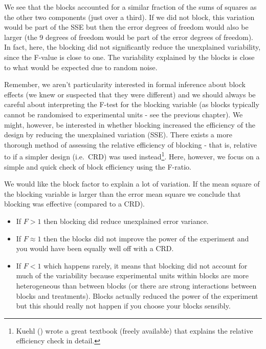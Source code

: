 \documentclass[
  letterpaper,
]{book}
\begin{document}

We see that the blocks accounted for a similar fraction of the sums of
squares as the other two components (just over a third). If we did not
block, this variation would be part of the SSE but then the error
degrees of freedom would also be larger (the 9 degrees of freedom would
be part of the error degrees of freedom). In fact, here, the blocking
did not significantly reduce the unexplained variability, since the
F-value is close to one. The variability explained by the blocks is
close to what would be expected due to random noise.

Remember, we aren't particularity interested in formal inference about
block effects (we knew or suspected that they were different) and we
should always be careful about interpreting the F-test for the blocking
variable (as blocks typically cannot be randomised to experimental units
- see the previous chapter). We might, however, be interested in whether
blocking increased the efficiency of the design by reducing the
unexplained variation (SSE). There exists a more thorough method of
assessing the relative efficiency of blocking - that is, relative to if
a simpler design (i.e.~CRD) was used instead\footnote{Kuehl
  () wrote a great textbook (freely
  available) that explains the relative efficiency check in detail.}.
Here, however, we focus on a simple and quick check of block efficiency
using the F-ratio.

We would like the block factor to explain a lot of variation. If the
mean square of the blocking variable is larger than the error mean
square we conclude that blocking was effective (compared to a CRD).

\begin{itemize}
\item
  If \(F > 1\) then blocking did reduce unexplained error variance.
\item
  If \(F \approx 1\) then the blocks did not improve the power of the
  experiment and you would have been equally well off with a CRD.
\item
  If \(F<1\) which happens rarely, it means that blocking did not
  account for much of the variability because experimental units within
  blocks are more heterogeneous than between blocks (or there are strong
  interactions between blocks and treatments). Blocks actually reduced
  the power of the experiment but this should really not happen if you
  choose your blocks sensibly.
\end{itemize}
\end{document}
